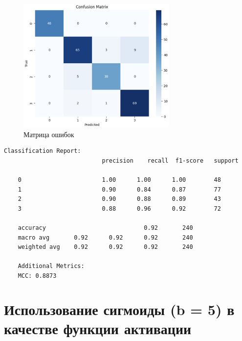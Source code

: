 \begin{figure}
	\begin{center}
		\includegraphics[width=0.7\textwidth]{images/6.png}
	\end{center}
	\caption{Матрица ошибок}
	\label{img:6}
\end{figure}

\begin{lstlisting}[label=lst:3,caption=Отчёт по результатам классификации]
	Classification Report:
							precision    recall  f1-score   support
	
	0       				1.00      1.00      1.00        48
	1       				0.90      0.84      0.87        77
	2       				0.90      0.88      0.89        43
	3       				0.88      0.96      0.92        72
	
	accuracy                           	0.92       240
	macro avg       0.92      0.92      0.92       240
	weighted avg    0.92      0.92      0.92       240
	
	Additional Metrics:
	MCC: 0.8873
\end{lstlisting}

\clearpage

\section{Использование сигмоиды (b = 5) в качестве функции активации}

